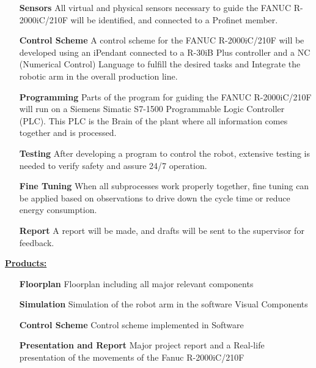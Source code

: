 \begin{itemize}[leftmargin=5cm]
	\item[\textbf{Sensors}] All virtual and physical sensors necessary to guide the FANUC R-2000iC/210F will be identified, and connected to a Profinet member.
	\item[\textbf{Control Scheme}] A control scheme for the FANUC R-2000iC/210F will be developed using an iPendant connected to a R-30iB Plus controller and a NC (Numerical Control) Language to fulfill the desired tasks and Integrate the robotic arm in the overall production line. 
	\item[\textbf{Programming}] Parts of the program for guiding the FANUC R-2000iC/210F will run on a Siemens Simatic S7-1500 Programmable Logic Controller (PLC). This PLC is the Brain of the plant where all information comes together and is processed.
	\item[\textbf{Testing}] After developing a program to control the robot, extensive testing is needed to verify safety and assure 24/7 operation.
	\item[\textbf{Fine Tuning}] When all subprocesses work properly together, fine tuning can be applied based on observations to drive down the cycle time or reduce energy consumption.
	\item[\textbf{Report}] A report will be made, and drafts will be sent to the supervisor for feedback. 
\end{itemize}
\bigskip
\underline{\textbf{Products:}}\vspace{2mm}
\begin{itemize}[leftmargin=5cm]
	\item[\textbf{Floorplan}] Floorplan including all major relevant components
	\item[\textbf{Simulation}] Simulation of the robot arm in the software Visual Components
	\item[\textbf{Control Scheme}] Control scheme implemented in Software 
	\item[\textbf{Presentation and Report}] Major project report and a Real-life presentation of the movements of the Fanuc R-2000iC/210F
\end{itemize}
%
